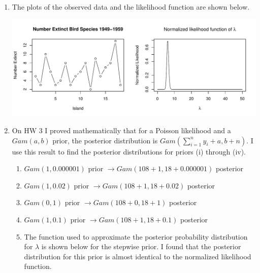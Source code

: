 \documentclass[11pt]{article}\usepackage[]{graphicx}\usepackage[]{color}
\newenvironment{knitrout}{}{} %
\begin{document}
\begin{doublespacing}
\begin{enumerate}
\begin{enumerate}
\begin{center}
\begin{knitrout}
\end{knitrout}
\end{center}

\item The plots of the observed data and the likelihood function are shown below.

\begin{knitrout}\footnotesize
{}\color{fgcolor}
\includegraphics[width=\linewidth]{figure/likefun-1} 

\end{knitrout}


\item On HW 3 I proved mathematically that for a Poisson likelihood and a $Gam(a, b)$ prior, the posterior distribution is $Gam(\sum_{i=1}^n y_i+a, b+n)$. I use this result to find the posterior distributions for priors (i) through (iv).

\begin{enumerate}

\item $Gam(1, 0.000001)$ prior $\rightarrow Gam(108+1, 18+0.000001)$ posterior

\item $Gam(1, 0.02)$ prior $\rightarrow Gam(108+1, 18+0.02)$ posterior

\item $Gam(0, 1)$ prior $\rightarrow Gam(108+0, 18+1)$ posterior

\item $Gam(1, 0.1)$ prior $\rightarrow Gam(108+1, 18+0.1)$ posterior

\item The function used to approximate the posterior probability distribution for $\lambda$ is shown below for the stepwise prior. I found that the posterior distribution for this prior is almost identical to the normalized likelihood function. 




\end{enumerate}
\end{enumerate}
\end{enumerate}
\end{doublespacing}
\end{document}

